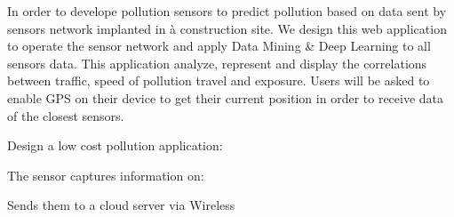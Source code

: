 In order to develope pollution sensors to predict pollution based on data sent by sensors network implanted in à construction site.
We design this web application to operate the sensor network and apply Data Mining & Deep Learning to all sensors data.
This application analyze,
	represent and display the correlations between traffic,
	speed of pollution travel and exposure.
Users will be asked to enable GPS on their device to get their current position in order to receive data of the closest sensors.


Design a low cost pollution application:

The sensor captures information on:

Sends them to a cloud server via Wireless

